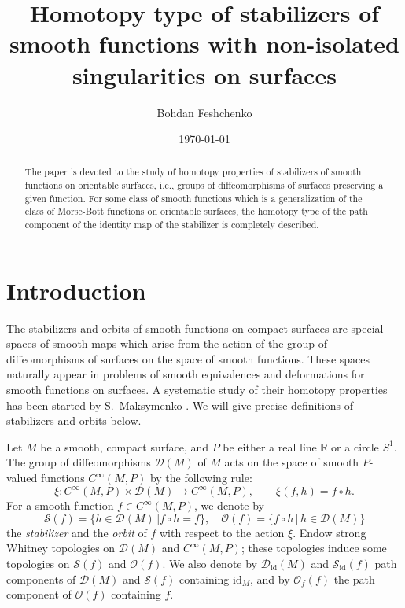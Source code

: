\documentclass[10pt,reqno]{amsart}
\title[Homotopy type of stabilizers of smooth functions]{Homotopy type of stabilizers of smooth functions with non-isolated singularities on surfaces}
\author{Bohdan Feshchenko}
\date{\today}
\newcommand{\bbR}{\mathbb{R}}
\newcommand{\id}{\mathrm{id}}
\begin{document}
\maketitle
\begin{abstract}
The paper is devoted to the study of homotopy properties of stabilizers of smooth functions on orientable surfaces, i.e., groups of diffeomorphisms of surfaces preserving a given function. For some class of smooth functions which is a generalization of the class of Morse-Bott functions on orientable surfaces, the homotopy type of the path component of the identity map of the stabilizer is completely described.
\end{abstract}
\section{Introduction}
The stabilizers and orbits of smooth functions on compact surfaces are special spaces of smooth maps which arise from the action of the group of diffeomorphisms of surfaces on the space of smooth functions. These spaces naturally appear  in problems of smooth equivalences and  deformations for smooth functions on surfaces. A systematic study of their homotopy properties  has been started  by S.~Maksymenko \cite{Maksymenko:AGAG:2006}.
 We will give precise definitions of stabilizers and orbits below.

Let $M$ be a smooth, compact surface, and $P$ be either a real line $\bbR$ or a circle $S^1$. The group  of diffeomorphisms $\mathcal{D}(M)$ of $M$ acts on the space of smooth $P$-valued functions $C^{\infty}(M,P)$ by the following rule:
$$
\xi: C^{\infty}(M,P)\times \mathcal{D}(M)\to C^{\infty}(M,P),\qquad \xi(f, h) = f\circ h.
$$
For a smooth function $f\in C^{\infty}(M,P)$,  we denote by 
$$
\mathcal{S}(f) = \{h\in \mathcal{D}(M)\,| f\circ h = f \},\quad \mathcal{O}(f) = \{ f\circ h\,|\, h\in \mathcal{D}(M) \}
$$
the {\it stabilizer} and the {\it orbit} of $f$ with respect to the action $\xi$. Endow strong Whitney topologies on $\mathcal{D}(M)$ and $C^{\infty}(M,P)$; these topologies induce some topologies on $\mathcal{S}(f)$ and $\mathcal{O}(f)$. We also denote by $\mathcal{D}_{\id}(M)$ and $\mathcal{S}_{\id}(f)$ path components  of $\mathcal{D}(M)$ and $\mathcal{S}(f)$ containing $\id_M$, and by $\mathcal{O}_f(f)$ the path component of $\mathcal{O}(f)$ containing $f$.
\end{document}
